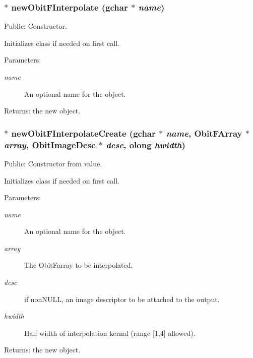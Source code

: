 \subsubsection{$\ast$ new\-Obit\-FInterpolate (gchar $\ast$ {\em name})}\label{ObitFInterpolate_8h_a4}


Public: Constructor. 

Initializes class if needed on first call. \begin{Desc}
\item[Parameters:]
\begin{description}
\item[{\em name}]An optional name for the object. \end{description}
\end{Desc}
\begin{Desc}
\item[Returns:]the new object. \end{Desc}
\subsubsection{$\ast$ new\-Obit\-FInterpolate\-Create (gchar $\ast$ {\em name}, {\bf Obit\-FArray} $\ast$ {\em array}, {\bf Obit\-Image\-Desc} $\ast$ {\em desc}, {\bf olong} {\em hwidth})}\label{ObitFInterpolate_8h_a5}


Public: Constructor from value. 

Initializes class if needed on first call. \begin{Desc}
\item[Parameters:]
\begin{description}
\item[{\em name}]An optional name for the object. \item[{\em array}]The Obit\-Farray to be interpolated. \item[{\em desc}]if non\-NULL, an image descriptor to be attached to the output. \item[{\em hwidth}]Half width of interpolation kernal (range [1,4] allowed). \end{description}
\end{Desc}
\begin{Desc}
\item[Returns:]the new object. \end{Desc}

